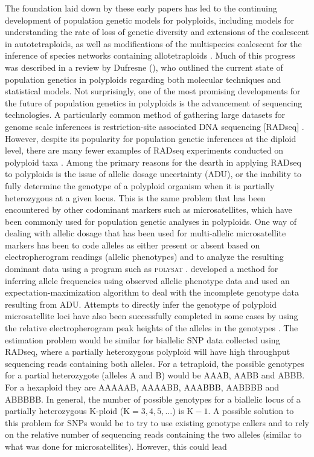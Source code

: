 \documentclass[11pt,english,letterpaper,oneside]{article}
\begin{document}
The foundation laid down by these early papers has led to the continuing development of population genetic models for polyploids, including models for understanding the rate of loss of genetic diversity and extensions of the coalescent in autotetraploids, as well as modifications of the multispecies coalescent for the inference of species networks containing allotetraploids \citep{moody1993autopolyploids,arnold2012autotetraploidCoal,jones2013allopolyploid}. Much of this progress was described in a review by Dufresne \etal{} (\citeyear{dufresne2014polyPopGen}), who outlined the current state of population genetics in polyploids regarding both molecular techniques and statistical models. Not surprisingly, one of the most promising developments for the future of population genetics in polyploids is the advancement of sequencing technologies. A particularly common method of gathering large datasets for genome scale inferences is restriction-site associated DNA sequencing [RADseq] \citep{miller2007gbs,baird2008radTags,puritz2014demystifyingRAD}. However, despite its popularity for population genetic inferences at the diploid level, there are many fewer examples of RADseq experiments conducted on polyploid taxa \citep[but see][]{ogden2013sturgeonRADseq,wang2013birchRADseq,logan-young2015polyploidSNP}. Among the primary reasons for the dearth in applying RADseq to polyploids is the issue of allelic dosage uncertainty (ADU), or the inability to fully determine the genotype of a polyploid organism when it is partially heterozygous at a given locus. This is the same problem that has been encountered by other codominant markers such as microsatellites, which have been commonly used for population genetic analyses in polyploids. One way of dealing with allelic dosage that has been used for multi-allelic microsatellite markers has been to code alleles as either present or absent based on electropherogram readings (allelic phenotypes) and to analyze the resulting dominant data using a program such as \textsc{polysat} \citep{clark2007polysat,dufresne2014polyPopGen}. \cite{deSilva2005alleleFreqs} developed a method for inferring allele frequencies using observed allelic phenotype data and used an expectation-maximization algorithm to deal with the incomplete genotype data resulting from ADU. Attempts to directly infer the genotype of polyploid microsatellite loci have also been successfully completed in some cases by using the relative electropherogram peak heights of the alleles in the genotypes \citep{esselink2004polyploidSSR}. The estimation problem would be similar for biallelic SNP data collected using RADseq, where a partially heterozygous polyploid will have high throughput sequencing reads containing both alleles. For a tetraploid, the possible genotypes for a partial heterozygote (alleles A and B) would be AAAB, AABB and ABBB. For a hexaploid they are AAAAAB, AAAABB, AAABBB, AABBBB and ABBBBB. In general, the number of possible genotypes for a biallelic locus of a partially heterozygous K-ploid ($\text{K}=3,4,5,\ldots$) is $\text{K}-1$. A possible solution to this problem for SNPs would be to try to use existing genotype callers and to rely on the relative number of sequencing reads containing the two alleles (similar to what was done for microsatellites). However, this could lead 
\end{document}
